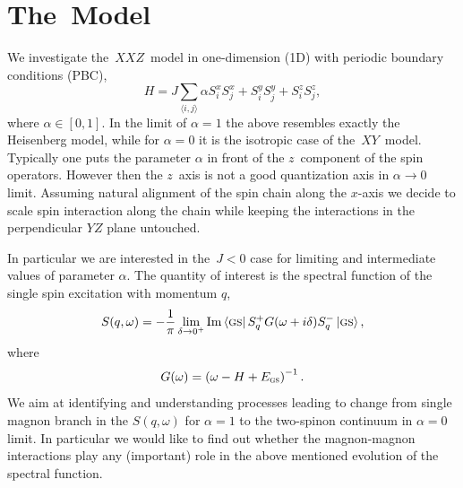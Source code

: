 \documentclass[12pt, a4paper]{article}
\newcommand{\mean}[1]{\langle#1\rangle}
\begin{document}
\section{The~Model}
We investigate the~$XXZ$~model in one-dimension (1D) with periodic boundary conditions (PBC),
\begin{equation}
H = J\sum_{\mean{i,j}} \alpha S_i^x S_j^x + S_i^y S_j^y + S_i^z S_j^z,
\end{equation}
where $\alpha \in [0, 1]$. In the limit of $\alpha = 1$ the above resembles exactly the Heisenberg model, while for $\alpha = 0$ it is the isotropic case of the~$XY$~model. Typically one puts the parameter $\alpha$ in front of the $z$~component of the spin operators. However then the $z$~axis is not a good quantization axis in $\alpha \to 0$ limit. Assuming natural alignment of the spin chain along the $x$-axis we decide to scale spin interaction along the chain while keeping the interactions in the perpendicular $YZ$ plane untouched.

In particular we are interested in the~$J < 0$ case for limiting and intermediate values of parameter $\alpha$. The quantity of interest is the spectral function of the single spin excitation with momentum $q$,
\begin{equation}
S(q,\omega) = -\frac{1}{\pi} \lim_{\delta\to 0^+} \Im\bra{\textsc{gs}}S_q^+ G(\omega + i\delta) S_q^- \ket{\textsc{gs}},
\end{equation}
where
\begin{equation}
G(\omega) = \left(\omega - H + E_{\textsc{gs}}\right)^{-1}.
\end{equation}
We aim at identifying and understanding processes leading to change from single magnon branch in the $S(q,\omega)$ for $\alpha = 1$ to the two-spinon continuum in $\alpha = 0$ limit. In particular we would like to find out whether the magnon-magnon interactions play any (important) role in the above mentioned evolution of the spectral function.
\end{document}
